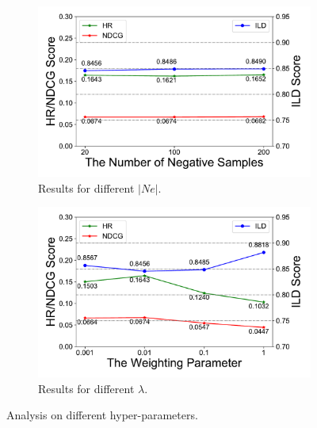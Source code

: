 \begin{figure}[ht]
  \begin{subfigure}{.235\textwidth}
    \centering
    \includegraphics[width=\linewidth]{fig/parameter_a.pdf}  
    \caption{Results for different $|Ne|$.}
    \label{fig:para_a}
  \end{subfigure}
  \begin{subfigure}{.235\textwidth}
    \centering
    \includegraphics[width=\linewidth]{fig/parameter_b.pdf}  
    \caption{Results for different $\lambda$.}
    \label{fig:para_b}
  \end{subfigure}
  \caption{Analysis on different hyper-parameters.}
  \label{fig:para}
\end{figure}


